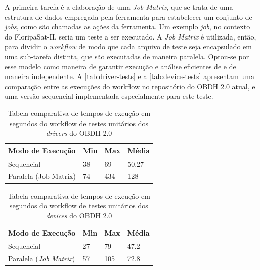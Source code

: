             A primeira tarefa é a elaboração de uma \textit{Job Matrix}, que se trata de uma estrutura de dados empregada pela ferramenta para estabelecer um conjunto de \textit{jobs}, como são chamadas as ações da ferramenta. Um exemplo \textit{job}, no contexto do FloripaSat-II, seria um teste a ser executado. A \textit{Job Matrix} é utilizada, então, para dividir o \textit{workflow} de modo que cada arquivo de teste seja encapsulado em uma sub-tarefa distinta, que são executadas de maneira paralela. Optou-se por esse modelo como maneira de garantir execução e análise eficientes de e de maneira independente. A \autoref{tab:driver-tests} e a \autoref{tab:device-tests} apresentam uma comparação entre as execuções do workflow no repositório do OBDH 2.0 atual, e uma versão sequencial implementada especialmente para este teste.
            
\begin{table}[ht!]
\centering
\begin{tabular}{|l|l|l|l|}
\hline
\textbf{Modo de Execução  }    & \textbf{Min} & \textbf{Max}  & \textbf{Média} \\ \hline
Sequencial            & 38  & 69   & 50.27  \\ \hline
Paralela (Job Matrix) & 74  & 434\footnotemark & 128  \\ \hline
\end{tabular}
\caption{Tabela comparativa de tempos de exeução em segundos do workflow de testes unitários dos \textit{drivers} do OBDH 2.0}
\label{tab:driver-tests}
\end{table}
            
\begin{table}[ht!]
\centering
\begin{tabular}{|l|l|l|l|}
\hline
\textbf{Modo de Execução }     & \textbf{Min} & \textbf{Max} & \textbf{Média} \\ \hline
Sequencial            & 27  & 79  & 47.2  \\ \hline
Paralela (\textit{Job Matrix}) & 57  & 105 & 72.8  \\ \hline
\end{tabular}
\caption{Tabela comparativa de tempos de exeução em segundos do workflow de testes unitários dos \textit{devices} do OBDH 2.0}
\label{tab:device-tests}
\end{table}
        
            
